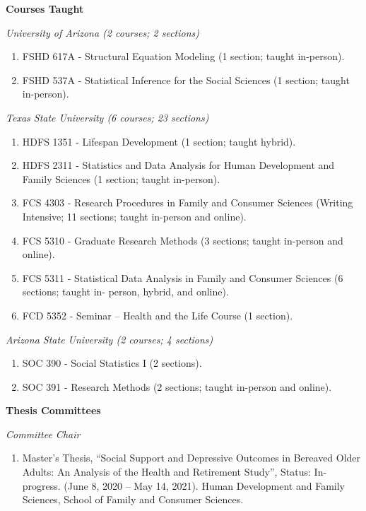 \documentclass[
]{article}
\providecommand{\tightlist}{%
  \setlength{\itemsep}{0pt}\setlength{\parskip}{0pt}}
\begin{document}
\textbf{Courses Taught}

\emph{University of Arizona (2 courses; 2 sections)}

\begin{enumerate}
\def\labelenumi{\arabic{enumi}.}
\tightlist
\item
  FSHD 617A - Structural Equation Modeling (1 section; taught
  in-person).
\item
  FSHD 537A - Statistical Inference for the Social Sciences (1 section;
  taught in-person).
\end{enumerate}

\emph{Texas State University (6 courses; 23 sections)}

\begin{enumerate}
\def\labelenumi{\arabic{enumi}.}
\item
  HDFS 1351 - Lifespan Development (1 section; taught hybrid).
\item
  HDFS 2311 - Statistics and Data Analysis for Human Development and
  Family Sciences (1 section; taught in-person).
\item
  FCS 4303 - Research Procedures in Family and Consumer Sciences
  (Writing Intensive; 11 sections; taught in-person and online).
\item
  FCS 5310 - Graduate Research Methods (3 sections; taught in-person and
  online).
\item
  FCS 5311 - Statistical Data Analysis in Family and Consumer Sciences
  (6 sections; taught in- person, hybrid, and online).
\item
  FCD 5352 - Seminar -- Health and the Life Course (1 section).
\end{enumerate}

\emph{Arizona State University (2 courses; 4 sections)}

\begin{enumerate}
\def\labelenumi{\arabic{enumi}.}
\item
  SOC 390 - Social Statistics I (2 sections).
\item
  SOC 391 - Research Methods (2 sections; taught in-person and online).
\end{enumerate}

\textbf{Thesis Committees}

\emph{Committee Chair}

\begin{enumerate}
\def\labelenumi{\arabic{enumi}.}
\tightlist
\item
  Master's Thesis, ``Social Support and Depressive Outcomes in Bereaved
  Older Adults: An Analysis of the Health and Retirement Study'',
  Status: In-progress. (June 8, 2020 -- May 14, 2021). Human Development
  and Family Sciences, School of Family and Consumer Sciences.
\end{enumerate}
\end{document}
